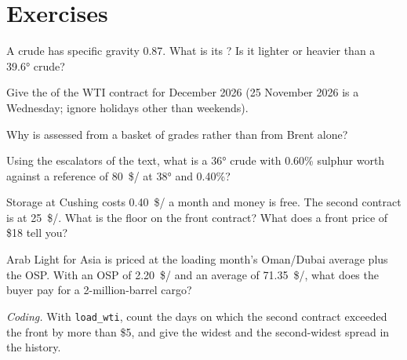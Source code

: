 \section{Exercises}

\begin{exercise}[$\star$]\label{exo:m3:crude-oil:1}
A crude has specific gravity 0.87. What is its ? Is it lighter or heavier
than a 39.6° crude?
\end{exercise}

\begin{exercise}[$\star$]\label{exo:m3:crude-oil:2}
Give the  of the WTI contract for December 2026 (25 November 2026 is
a Wednesday; ignore holidays other than weekends).
\end{exercise}

\begin{exercise}[$\star$]\label{exo:m3:crude-oil:3}
Why is  assessed from a basket of grades rather than from Brent alone?
\end{exercise}

\begin{exercise}[$\star\star$]\label{exo:m3:crude-oil:4}
Using the escalators of the text, what is a 36° crude with 0.60\% sulphur worth
against a reference of \qty{80}{\$/\barrel} at 38° and 0.40\%?
\end{exercise}

\begin{exercise}[$\star\star$]\label{exo:m3:crude-oil:5}
Storage at Cushing costs \qty{0.40}{\$/\barrel} a month and money is free. The second
contract is at \qty{25}{\$/\barrel}. What is the floor on the front contract? What does
a front price of \$18 tell you?
\end{exercise}

\begin{exercise}[$\star\star$]\label{exo:m3:crude-oil:6}
Arab Light for Asia is priced at the loading month's Oman/Dubai average plus the OSP.
With an OSP of \qty{2.20}{\$/\barrel} and an average of \qty{71.35}{\$/\barrel}, what does
the buyer pay for a 2-million-barrel cargo?
\end{exercise}

\begin{exercise}[$\star\star\star$]\label{exo:m3:crude-oil:7}
\emph{Coding.} With \texttt{load\_wti}, count the days on which the second contract
exceeded the front by more than \$5, and give the widest and the second-widest spread
in the history.
\end{exercise}

